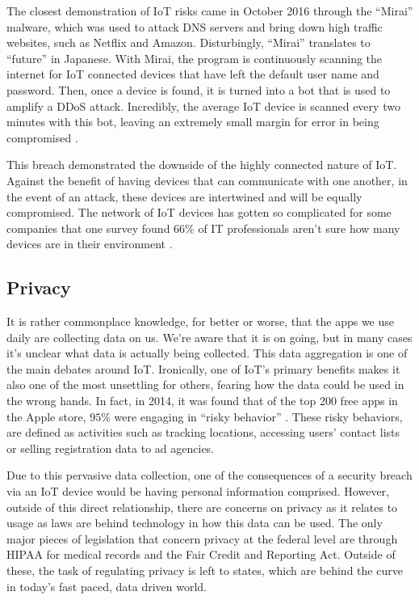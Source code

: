 \documentclass[sigconf]{acmart}
\begin{document}
The closest demonstration of IoT risks came in October 2016 through the ``Mirai'' malware, which was used to attack DNS servers and bring down high traffic websites, such as Netflix and Amazon. Disturbingly, ``Mirai'' translates to ``future'' in Japanese.  With Mirai, the program is continuously scanning the internet for IoT connected devices that have left the default user name and password. Then, once a device is found, it is turned into a bot that is used to amplify a DDoS attack. Incredibly, the average IoT device is scanned every two minutes with this bot, leaving an extremely small margin for error in being compromised \cite{botnet}.

This breach demonstrated the downside of the highly connected nature of IoT. Against the benefit of having devices that can communicate with one another, in the event of an attack, these devices are intertwined and will be equally compromised. The network of IoT devices has gotten so complicated for some companies that one survey found $66\%$ of IT professionals aren't sure how many devices are in their environment \cite{mirai}. 

\subsection{Privacy}

It is rather commonplace knowledge, for better or worse, that the apps we use daily are collecting data on us. We're aware that it is on going, but in many cases it's unclear what data is actually being collected. This data aggregation is one of the main debates around IoT. Ironically, one of IoT's primary benefits makes it also one of the most unsettling for others, fearing how the data could be used in the wrong hands. In fact, in 2014, it was found that of the top 200 free apps in the Apple store, $95\%$ were engaging in ``risky behavior'' \cite{privacy}. These risky behaviors, are defined as activities such as tracking locations, accessing users' contact lists or selling registration data to ad agencies.

Due to this pervasive data collection, one of the consequences of a security breach via an IoT device would be having personal information comprised. However, outside of this direct relationship, there are concerns on privacy as it relates to usage as laws are behind technology in how this data can be used. The only major pieces of legislation that concern privacy at the federal level are through HIPAA for medical records and the Fair Credit and Reporting Act. Outside of these, the task of regulating privacy is left to states, which are behind the curve in today's fast paced, data driven world. 
\end{document}
